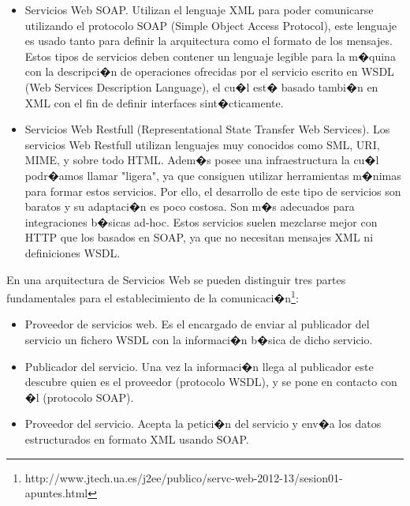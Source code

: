 \begin{itemize}
 \item Servicios Web SOAP. Utilizan el lenguaje XML para poder comunicarse utilizando el protocolo SOAP (Simple Object Access Protocol), este lenguaje es usado tanto para definir la arquitectura como el formato de los mensajes. Estos tipos de servicios deben contener un lenguaje legible para la m�quina con la descripci�n de operaciones ofrecidas por el servicio escrito en WSDL (Web Services Description Language), el cu�l est� basado tambi�n en XML con el fin de definir interfaces sint�cticamente.
 
  \item Servicios Web Restfull (Representational State Transfer Web Services).  Los servicios Web Restfull utilizan lenguajes muy conocidos como SML, URI, MIME, y sobre todo HTML. Adem�s posee una infraestructura la cu�l podr�amos llamar "ligera", ya que consiguen utilizar herramientas m�nimas para formar estos servicios. Por ello, el desarrollo de este tipo de servicios son baratos y su adaptaci�n es poco costosa. Son m�s adecuados para integraciones b�sicas ad-hoc. Estos servicios suelen mezclarse mejor con HTTP que los basados en SOAP, ya que no necesitan mensajes XML ni definiciones WSDL.
   
\end{itemize}

En una arquitectura de Servicios Web se pueden distinguir tres partes fundamentales para el establecimiento de la comunicaci�n\footnote{http://www.jtech.ua.es/j2ee/publico/servc-web-2012-13/sesion01-apuntes.html}: 

\begin{itemize}
  \item Proveedor de servicios web. Es el encargado de enviar al publicador del servicio un fichero WSDL con la informaci�n b�sica de dicho servicio.
   \item Publicador del servicio. Una vez la informaci�n llega al publicador este descubre quien es el proveedor (protocolo WSDL), y se pone en contacto con �l (protocolo SOAP).
   \item Proveedor del servicio. Acepta la petici�n del servicio y env�a los datos estructurados en formato XML usando SOAP.  
\end{itemize}

